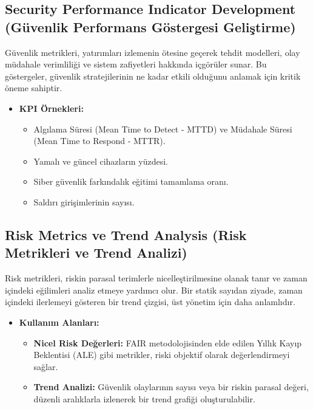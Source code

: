 \subsection{Security Performance Indicator Development (Güvenlik Performans Göstergesi Geliştirme)}

Güvenlik metrikleri, yatırımları izlemenin ötesine geçerek tehdit modelleri, olay müdahale verimliliği ve sistem zafiyetleri hakkında içgörüler sunar. Bu göstergeler, güvenlik stratejilerinin ne kadar etkili olduğunu anlamak için kritik öneme sahiptir.
\begin{itemize}
    \item \textbf{KPI Örnekleri:}
    \begin{itemize}
        \item Algılama Süresi (Mean Time to Detect - MTTD) ve Müdahale Süresi (Mean Time to Respond - MTTR).
        \item Yamalı ve güncel cihazların yüzdesi.
        \item Siber güvenlik farkındalık eğitimi tamamlama oranı.
        \item Saldırı girişimlerinin sayısı.
    \end{itemize}
\end{itemize}

\subsection{Risk Metrics ve Trend Analysis (Risk Metrikleri ve Trend Analizi)}

Risk metrikleri, riskin parasal terimlerle nicelleştirilmesine olanak tanır ve zaman içindeki eğilimleri analiz etmeye yardımcı olur. Bir statik sayıdan ziyade, zaman içindeki ilerlemeyi gösteren bir trend çizgisi, üst yönetim için daha anlamlıdır.
\begin{itemize}
    \item \textbf{Kullanım Alanları:}
    \begin{itemize}
        \item \textbf{Nicel Risk Değerleri:} FAIR metodolojisinden elde edilen Yıllık Kayıp Beklentisi (ALE) gibi metrikler, riski objektif olarak değerlendirmeyi sağlar.
        \item \textbf{Trend Analizi:} Güvenlik olaylarının sayısı veya bir riskin parasal değeri, düzenli aralıklarla izlenerek bir trend grafiği oluşturulabilir.
    \end{itemize}
\end{itemize}

